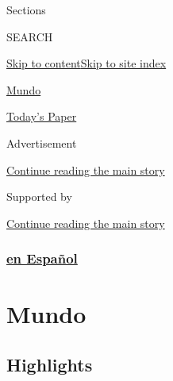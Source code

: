 Sections

SEARCH

\protect\hyperlink{site-content}{Skip to
content}\protect\hyperlink{site-index}{Skip to site index}

\href{https://www.nytimes3xbfgragh.onion/es/section/mundo}{Mundo}

\href{https://myaccount.nytimes3xbfgragh.onion/auth/login?response_type=cookie\&client_id=vi}{}

\href{https://www.nytimes3xbfgragh.onion/section/todayspaper}{Today's
Paper}

Advertisement

\protect\hyperlink{after-top}{Continue reading the main story}

Supported by

\protect\hyperlink{after-sponsor}{Continue reading the main story}

\hypertarget{en-espauxf1ol}{%
\subsubsection{\texorpdfstring{\href{/es/}{en
Español}}{en Español}}\label{en-espauxf1ol}}

\hypertarget{mundo}{%
\section{Mundo}\label{mundo}}

\hypertarget{highlights}{%
\subsection{Highlights}\label{highlights}}

